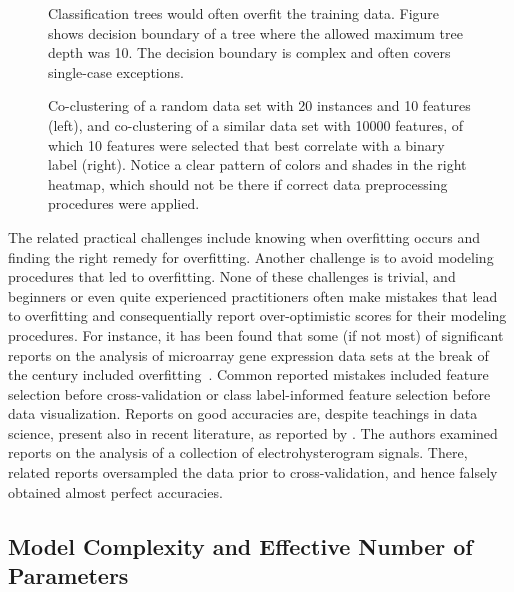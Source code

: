 \begin{refsection}
\begin{figure}[htbp]
\caption{Classification trees would often overfit the training data. Figure shows decision boundary of a tree where the allowed maximum tree depth was 10. The decision boundary is complex and often covers single-case exceptions.}
\label{fig:tree-overfit}
\end{figure}

\begin{figure}[htbp]
\caption{Co-clustering of a random data set with 20 instances and 10 features (left), and co-clustering of a similar data set with 10000 features, of which 10 features were selected that best correlate with a binary label (right). Notice a clear pattern of colors and shades in the right heatmap, which should not be there if correct data preprocessing procedures were applied.}
\label{fig:heatmaps-overfitting}
\end{figure}

The related practical challenges include knowing when overfitting occurs and finding the right remedy for overfitting. Another challenge is to avoid modeling procedures that led to overfitting. None of these challenges is trivial, and beginners or even quite experienced practitioners often make mistakes that lead to overfitting and consequentially report over-optimistic scores for their modeling procedures. For instance, it has been found that some (if not most) of significant reports on the analysis of microarray gene expression data sets at the break of the century included overfitting~\citep{2003-Simon}. Common reported mistakes included feature selection before cross-validation or class label-informed feature selection before data visualization. Reports on good accuracies are, despite teachings in data science, present also in recent literature, as reported by \citet{2019-Vandewiele}. The authors examined reports on the analysis of a collection of electrohysterogram signals. There, related reports oversampled the data prior to cross-validation, and hence falsely obtained almost perfect accuracies.


\subsection*{Model Complexity and Effective Number of Parameters}


\end{refsection}
